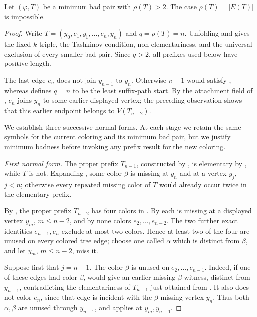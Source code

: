 \begin{lemma}
Let \((\varphi,T)\) be a minimum bad pair with \(\rho(T)>2\).  The case
\(\rho(T)=|E(T)|\) is impossible.
\end{lemma}
\begin{proof}
Write \(T=(y_0,e_1,y_1,\ldots,e_n,y_n)\) and
\(q=\rho(T)=n\).  Unfolding  and
 gives the fixed \(k\)-triple, the Tashkinov
condition, non-elementariness, and the universal exclusion of every
smaller bad pair.  Since \(q>2\), all prefixes used below have positive
length.

The last edge \(e_n\) does not join \(y_{n-1}\) to \(y_n\).  Otherwise
\(n-1\) would satisfy , whereas
 defines \(q=n\) to be the least suffix-path
start.  By the attachment field of , \(e_n\) joins
\(y_n\) to some earlier displayed vertex; the preceding observation shows
that this earlier endpoint belongs to \(V(T_{n-2})\).

We establish three successive normal forms.  At each stage we retain the
same symbols for the current coloring and its minimum bad pair, but we
justify minimum badness before invoking any prefix result for the new
coloring.

\emph{First normal form.}
The proper prefix \(T_{n-1}\), constructed by
, is elementary by
, while \(T\) is not.  Expanding
, some color \(\beta\) is missing at
\(y_n\) and at a vertex \(y_j\), \(j<n\); otherwise every repeated
missing color of \(T\) would already occur twice in the elementary
prefix.

By , the proper prefix \(T_{n-2}\) has
four colors in .  By
 each is missing at a displayed vertex
\(y_m\), \(m\le n-2\), and by  none colors
\(e_2,\ldots,e_{n-2}\).  The two further exact identities
\(e_{n-1},e_n\) exclude at most two colors.  Hence at least two of the
four are unused on every colored tree edge; choose one called
\(\alpha\) which is distinct from \(\beta\), and let \(y_m\), \(m\le
n-2\), miss it.

Suppose first that \(j=n-1\).  The color \(\beta\) is unused on
\(e_2,\ldots,e_{n-1}\).  Indeed, if one of these edges had color
\(\beta\),  would give an earlier
missing-\(\beta\) witness, distinct from \(y_{n-1}\), contradicting
the elementariness of \(T_{n-1}\) just obtained from
.  It also does not color
\(e_n\), since that edge is incident with the \(\beta\)-missing vertex
\(y_n\).  Thus both \(\alpha,\beta\) are unused through \(y_{n-1}\), and
 applies at \(y_m,y_{n-1}\).


\end{proof}
